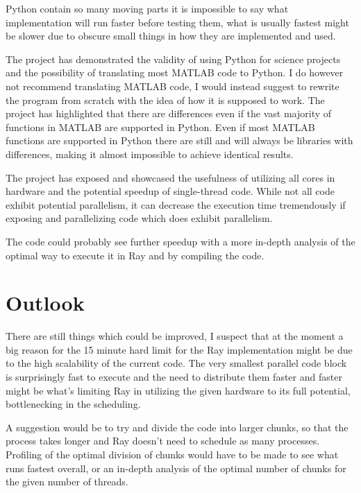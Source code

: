 \documentclass[12pt, a4paper]{article}
\begin{document}
Python contain so many moving parts it is impossible to say what implementation will run faster before testing them, what is usually fastest might be slower due to obscure small things in how they are implemented and used.

The project has demonstrated the validity of using Python for science projects and the possibility of translating most MATLAB code to Python.
I do however not recommend translating MATLAB code, I would instead suggest to rewrite the program from scratch with the idea of how it is supposed to work.
The project has highlighted that there are differences even if the vast majority of functions in MATLAB are supported in Python.
Even if most MATLAB functions are supported in Python there are still and will always be libraries with differences, making it almost impossible to achieve identical results.

The project has exposed and showcased the usefulness of utilizing all cores in hardware and the potential speedup of single-thread code.
While not all code exhibit potential parallelism, it can decrease the execution time tremendously if exposing and parallelizing code which does exhibit parallelism.

The code could probably see further speedup with a more in-depth analysis of the optimal way to execute it in Ray and by compiling the code.


\section{Outlook}

There are still things which could be improved, I suspect that at the moment a big reason for the 15 minute hard limit for the Ray implementation might be due to the high scalability of the current code.
The very smallest parallel code block is surprisingly fast to execute and the need to distribute them faster and faster might be what's limiting Ray in utilizing the given hardware to its full potential, bottlenecking in the scheduling.

A suggestion would be to try and divide the code into larger chunks, so that the process takes longer and Ray doesn't need to schedule as many processes.
Profiling of the optimal division of chunks would have to be made to see what runs fastest overall, or an in-depth analysis of the optimal number of chunks for the given number of threads.
\end{document}
